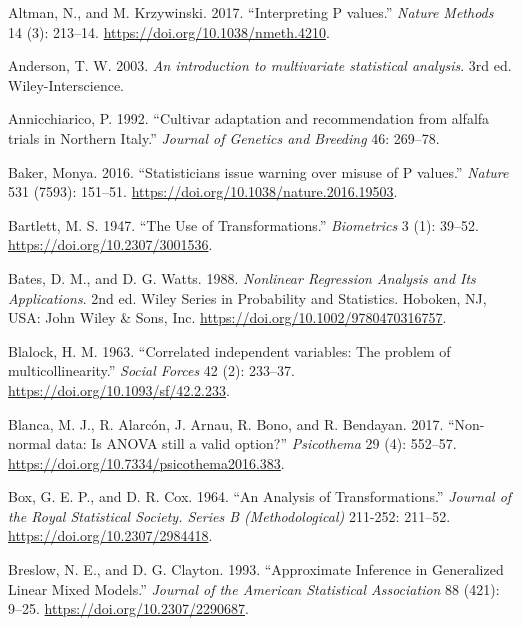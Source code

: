 \documentclass[
]{book}
\numberwithin{equation}{section}
\newlength{\cslhangindent}
\newenvironment{cslreferences}%
  {\setlength{\parindent}{0pt}%
  \everypar{\setlength{\hangindent}{\cslhangindent}}\ignorespaces}%
  {\par}
\begin{document}
\hypertarget{refs}{}
\begin{cslreferences}
\leavevmode\hypertarget{ref-Altman2017}{}%
Altman, N., and M. Krzywinski. 2017. ``Interpreting P values.'' \emph{Nature Methods} 14 (3): 213--14. \url{https://doi.org/10.1038/nmeth.4210}.

\leavevmode\hypertarget{ref-Anderson2003}{}%
Anderson, T. W. 2003. \emph{An introduction to multivariate statistical analysis}. 3rd ed. Wiley-Interscience.

\leavevmode\hypertarget{ref-Annicchiarico1992}{}%
Annicchiarico, P. 1992. ``Cultivar adaptation and recommendation from alfalfa trials in Northern Italy.'' \emph{Journal of Genetics and Breeding} 46: 269--78.

\leavevmode\hypertarget{ref-Baker2016}{}%
Baker, Monya. 2016. ``Statisticians issue warning over misuse of P values.'' \emph{Nature} 531 (7593): 151--51. \url{https://doi.org/10.1038/nature.2016.19503}.

\leavevmode\hypertarget{ref-Bartlett1947}{}%
Bartlett, M. S. 1947. ``The Use of Transformations.'' \emph{Biometrics} 3 (1): 39--52. \url{https://doi.org/10.2307/3001536}.

\leavevmode\hypertarget{ref-Bates1988}{}%
Bates, D. M., and D. G. Watts. 1988. \emph{Nonlinear Regression Analysis and Its Applications}. 2nd ed. Wiley Series in Probability and Statistics. Hoboken, NJ, USA: John Wiley \& Sons, Inc. \url{https://doi.org/10.1002/9780470316757}.

\leavevmode\hypertarget{ref-Blalock1963a}{}%
Blalock, H. M. 1963. ``Correlated independent variables: The problem of multicollinearity.'' \emph{Social Forces} 42 (2): 233--37. \url{https://doi.org/10.1093/sf/42.2.233}.

\leavevmode\hypertarget{ref-Blanca2017}{}%
Blanca, M. J., R. Alarcón, J. Arnau, R. Bono, and R. Bendayan. 2017. ``Non-normal data: Is ANOVA still a valid option?'' \emph{Psicothema} 29 (4): 552--57. \url{https://doi.org/10.7334/psicothema2016.383}.

\leavevmode\hypertarget{ref-Box1964}{}%
Box, G. E. P., and D. R. Cox. 1964. ``An Analysis of Transformations.'' \emph{Journal of the Royal Statistical Society. Series B (Methodological)} 211-252: 211--52. \url{https://doi.org/10.2307/2984418}.

\leavevmode\hypertarget{ref-Breslow1993}{}%
Breslow, N. E., and D. G. Clayton. 1993. ``Approximate Inference in Generalized Linear Mixed Models.'' \emph{Journal of the American Statistical Association} 88 (421): 9--25. \url{https://doi.org/10.2307/2290687}.


\end{cslreferences}
\end{document}
